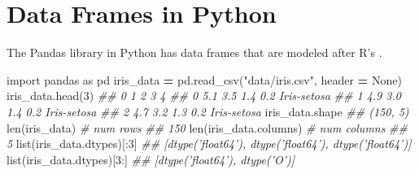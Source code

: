 \documentclass[12pt,krantz2]{krantz}
\makeatletter
\newenvironment{Shaded}{\begin{snugshade}}{\end{snugshade}}
\newcommand{\BuiltInTok}[1]{#1}
\newcommand{\CommentTok}[1]{\textcolor[rgb]{0.37,0.37,0.37}{\textit{#1}}}
\newcommand{\DataTypeTok}[1]{\textcolor[rgb]{0.27,0.27,0.27}{#1}}
\newcommand{\DecValTok}[1]{\textcolor[rgb]{0.06,0.06,0.06}{#1}}
\newcommand{\ImportTok}[1]{#1}
\newcommand{\KeywordTok}[1]{\textcolor[rgb]{0.27,0.27,0.27}{\textbf{#1}}}
\newcommand{\NormalTok}[1]{#1}
\newcommand{\OperatorTok}[1]{\textcolor[rgb]{0.43,0.43,0.43}{\textbf{#1}}}
\newcommand{\OtherTok}[1]{\textcolor[rgb]{0.37,0.37,0.37}{#1}}
\newcommand{\StringTok}[1]{\textcolor[rgb]{0.5,0.5,0.5}{#1}}
\newcommand{\VariableTok}[1]{\textcolor[rgb]{0,0,0}{#1}}
\newenvironment{kframe}{%
\medskip{}
\setlength{\fboxsep}{.8em}
 \def\at@end@of@kframe{}%
 \ifinner\ifhmode%
  \def\at@end@of@kframe{\end{minipage}}%
  \begin{minipage}{\columnwidth}%
 \fi\fi%
 \def\FrameCommand##1{\hskip\@totalleftmargin \hskip-\fboxsep
 \colorbox{shadecolor}{##1}\hskip-\fboxsep
     \hskip-\linewidth \hskip-\@totalleftmargin \hskip\columnwidth}%
 \MakeFramed {\advance\hsize-\width
   \@totalleftmargin\z@ \linewidth\hsize
   \@setminipage}}%
 {\par\unskip\endMakeFramed%
 \at@end@of@kframe}
\renewenvironment{Shaded}{\begin{kframe}}{\end{kframe}}
\makeatother
\begin{document}
\begin{Shaded}
\end{Shaded}

\hypertarget{data-frames-in-python}{%
\section{Data Frames in Python}\label{data-frames-in-python}}

The Pandas library in Python has data frames that are modeled after R's \citep{pandas_guy}.

\begin{Shaded}
\begin{Highlighting}[]
\ImportTok{import}\NormalTok{ pandas }\ImportTok{as}\NormalTok{ pd}
\NormalTok{iris_data }\OperatorTok{=}\NormalTok{ pd.read_csv(}\StringTok{"data/iris.csv"}\NormalTok{, header }\OperatorTok{=} \VariableTok{None}\NormalTok{)}
\NormalTok{iris_data.head(}\DecValTok{3}\NormalTok{)}
\CommentTok{##      0    1    2    3            4}
\CommentTok{## 0  5.1  3.5  1.4  0.2  Iris-setosa}
\CommentTok{## 1  4.9  3.0  1.4  0.2  Iris-setosa}
\CommentTok{## 2  4.7  3.2  1.3  0.2  Iris-setosa}
\NormalTok{iris_data.shape}
\CommentTok{## (150, 5)}
\BuiltInTok{len}\NormalTok{(iris_data) }\CommentTok{# num rows}
\CommentTok{## 150}
\BuiltInTok{len}\NormalTok{(iris_data.columns) }\CommentTok{# num columns}
\CommentTok{## 5}
\BuiltInTok{list}\NormalTok{(iris_data.dtypes)[:}\DecValTok{3}\NormalTok{]}
\CommentTok{## [dtype('float64'), dtype('float64'), dtype('float64')]}
\BuiltInTok{list}\NormalTok{(iris_data.dtypes)[}\DecValTok{3}\NormalTok{:]}
\CommentTok{## [dtype('float64'), dtype('O')]}
\end{Highlighting}
\end{Shaded}
\end{document}
